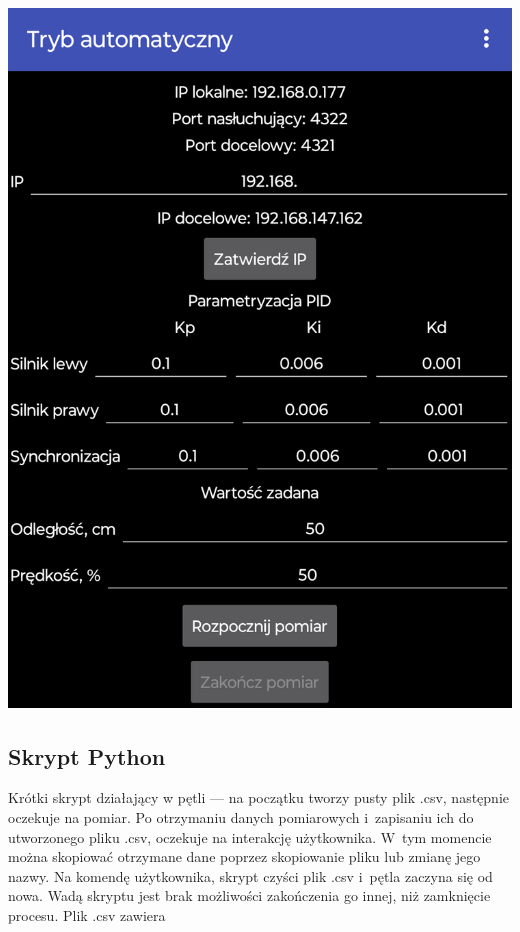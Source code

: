 \begin{center}
  \includegraphics[scale=0.3]{images/AndroidApp.png}
  \label{fig:aplikacja}
\end{center}

\subsection*{Skrypt Python}
Krótki skrypt działający w pętli --- na początku tworzy pusty plik .csv, następnie oczekuje na pomiar. Po otrzymaniu danych pomiarowych i~zapisaniu ich do utworzonego pliku .csv, oczekuje na interakcję użytkownika. W~tym momencie można skopiować otrzymane dane poprzez skopiowanie pliku lub zmianę jego nazwy. Na komendę użytkownika, skrypt czyści plik .csv i~pętla zaczyna się od nowa. Wadą skryptu jest brak możliwości zakończenia go innej, niż zamknięcie procesu. Plik .csv zawiera

